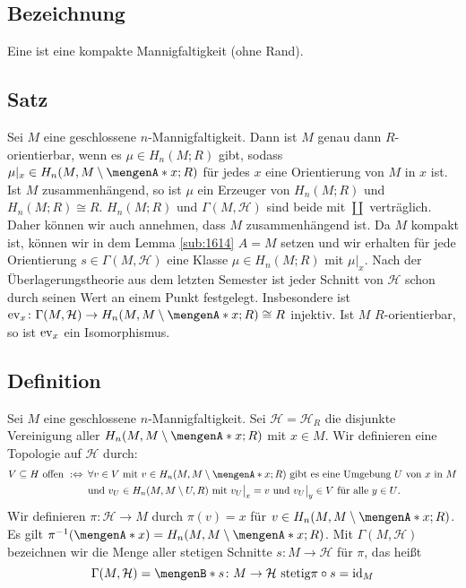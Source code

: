\subsection[Bezeichnung: Geschlossene Mannigfaltigkeit]{Bezeichnung} %
\label{sub:168}
Eine  ist eine kompakte Mannigfaltigkeit (ohne Rand).

\subsection{Satz} %
\label{sub:169}
Sei $M$ eine geschlossene $n$-Mannigfaltigkeit. Dann ist $M$ genau dann $R$-orientierbar, wenn es $\mu \in H_n(M;R)$ gibt, sodass $\mu|_x \in H_n(M,M\setminus \set{x};R)$
für jedes $x$ eine Orientierung von $M$ in $x$ ist. Ist $M$ zusammenhängend, so ist $\mu$ ein Erzeuger von $H_n(M;R)$ und $H_n(M;R)\cong R$.
$H_n(M;R)$ und $\Gamma(M,\mathcal{H})$ sind beide mit $\coprod$ verträglich. Daher können wir auch annehmen, dass $M$ zusammenhängend ist. Da $M$ kompakt ist, können wir 
in dem Lemma \ref{sub:1614} $A=M$ setzen und wir erhalten für jede Orientierung $s \in \Gamma(M,\mathcal{H})$ eine Klasse $\mu \in H_n(M;R)$ mit $\mu|_x$. Nach der 
Überlagerungstheorie aus dem letzten Semester ist jeder Schnitt von $\mathcal{H}$ schon durch seinen Wert an einem Punkt festgelegt. Insbesondere ist 
$\ev_x \colon\Gamma(M,\mathcal{H}) \to H_n(M,M \setminus \set{x};R ) \cong R$ injektiv. Ist $M$ $R$-orientierbar, so ist $\operatorname{ev}_x$ ein Isomorphismus. \bewende

\subsection{Definition} %
\label{sub:1610}
Sei $M$ eine geschlossene $n$-Mannigfaltigkeit. Sei $\mathcal{H}=\mathcal{H}_R$ die disjunkte Vereinigung aller $H_n(M,M\setminus \set{x};R)$ mit $x \in M$. Wir definieren
eine Topologie auf $\mathcal{H}$ durch:
\begin{align*}
	V \subseteq H \text{ offen } :\Leftrightarrow \enspace& \forall v \in V \text{ mit } v \in H_n(M,M \setminus \set{x};R) \text{ gibt es eine Umgebung $U$ von $x$ in $M$}\\
	&\text{und $v_U \in H_n(M,M \setminus U,R)$ mit } v_U\big|_x=v \text{ und } v_U\big|_y \in V \text{ für alle $y \in U$.}
\end{align*}
Wir definieren $\pi \colon \mathcal{H} \to M$ durch $\pi(v)=x$ für $v \in H_n(M,M \setminus \set{x};R)$. Es gilt $\pi ^{-1}(\set{x})= H_n(M,M \setminus \set{x};R)$.
Mit $\Gamma(M,\mathcal{H})$ bezeichnen wir die Menge aller stetigen Schnitte $s\colon M \to \mathcal{H}$ für $\pi$, das heißt 
\[
	\Gamma(M,\mathcal{H})= \set[s \colon M \to \mathcal{H} \text{ stetig}]{\pi  \circ s =\id_M} 
\]

